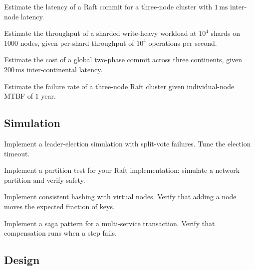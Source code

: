 \begin{exercise}
Estimate the latency of a Raft commit for a three-node cluster with $1\,\si{\milli\second}$ inter-node latency.
\end{exercise}

\begin{exercise}
Estimate the throughput of a sharded write-heavy workload at $10^4$ shards on $1000$ nodes, given per-shard throughput of $10^4$ operations per second.
\end{exercise}

\begin{exercise}
Estimate the cost of a global two-phase commit across three continents, given $200\,\si{\milli\second}$ inter-continental latency.
\end{exercise}

\begin{exercise}
Estimate the failure rate of a three-node Raft cluster given individual-node MTBF of $1$ year.
\end{exercise}

\subsection*{Simulation}

\begin{exercise}
Implement a leader-election simulation with split-vote failures. Tune the election timeout.
\end{exercise}

\begin{exercise}
Implement a partition test for your Raft implementation: simulate a network partition and verify safety.
\end{exercise}

\begin{exercise}
Implement consistent hashing with virtual nodes. Verify that adding a node moves the expected fraction of keys.
\end{exercise}

\begin{exercise}
Implement a saga pattern for a multi-service transaction. Verify that compensation runs when a step fails.
\end{exercise}

\subsection*{Design}

